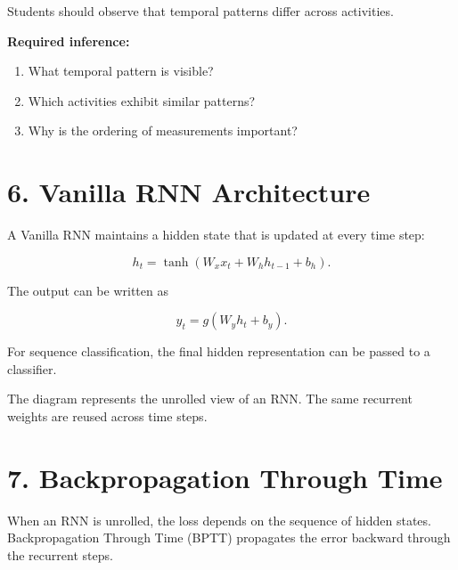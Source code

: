 \documentclass[10pt]{article}
\begin{document}
Students should observe that temporal patterns differ across activities.

\textbf{Required inference:}

\begin{enumerate}
\item What temporal pattern is visible?
\item Which activities exhibit similar patterns?
\item Why is the ordering of measurements important?
\end{enumerate}

\section*{6. Vanilla RNN Architecture}

A Vanilla RNN maintains a hidden state that is updated at every time step:

\[
h_t=\tanh(W_xx_t+W_hh_{t-1}+b_h).
\]

The output can be written as

\[
y_t=g(W_yh_t+b_y).
\]

For sequence classification, the final hidden representation can be passed
to a classifier.

\begin{center}
\end{center}

The diagram represents the unrolled view of an RNN. The same recurrent weights
are reused across time steps.

\section*{7. Backpropagation Through Time}

When an RNN is unrolled, the loss depends on the sequence of hidden states.
Backpropagation Through Time (BPTT) propagates the error backward through
the recurrent steps.
\end{document}
